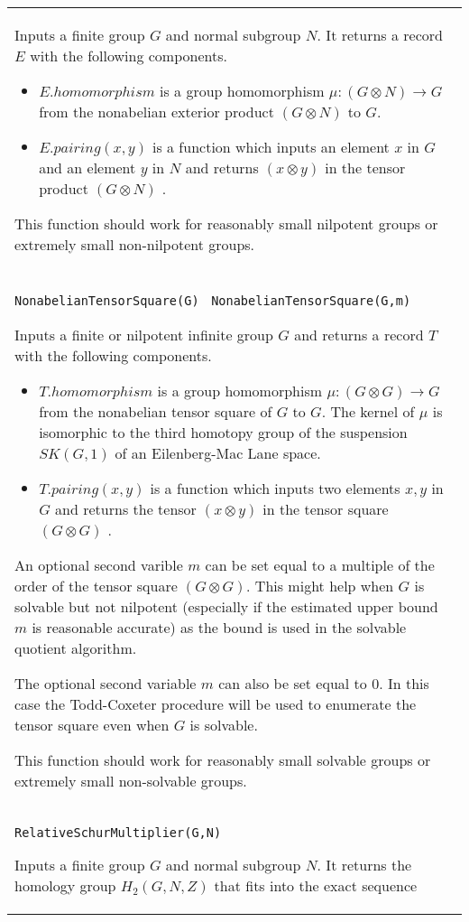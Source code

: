 \documentclass[a4paper,11pt]{report}
\begin{document}
{\begin{center}
\begin{tabular}{|l|}
 Inputs a finite group $G$ and normal subgroup $N$. It returns a record $E$ with the following components. 
\begin{itemize}
\item  $E.homomorphism$ is a group homomorphism ${\ensuremath{\mu}} : (G \otimes N ) \longrightarrow G$ from the nonabelian exterior product $(G \otimes N)$ to $G$. 
\item  $E.pairing(x,y)$ is a function which inputs an element $x$ in $G$ and an element $y$ in $N$ and returns $(x \otimes y)$ in the tensor product $(G \otimes N)$ . 
\end{itemize}
 This function should work for reasonably small nilpotent groups or extremely
small non-nilpotent groups. \\
 \index{NonabelianTensorSquare} \texttt{NonabelianTensorSquare(G) } \texttt{NonabelianTensorSquare(G,m) } 

 Inputs a finite or nilpotent infinite group $G$ and returns a record $T$ with the following components. 
\begin{itemize}
\item  $T.homomorphism$ is a group homomorphism ${\ensuremath{\mu}} : (G \otimes G) \longrightarrow G$ from the nonabelian tensor square of $G$ to $G$. The kernel of ${\ensuremath{\mu}}$ is isomorphic to the third homotopy group of the suspension $SK(G,1)$ of an Eilenberg-Mac Lane space. 
\item  $T.pairing(x,y)$ is a function which inputs two elements $x, y$ in $G$ and returns the tensor $(x \otimes y)$ in the tensor square $(G \otimes G)$ . 
\end{itemize}
 An optional second varible $m$ can be set equal to a multiple of the order of the tensor square $(G \otimes G)$. This might help when $G$ is solvable but not nilpotent (especially if the estimated upper bound $m$ is reasonable accurate) as the bound is used in the solvable quotient
algorithm. 

 The optional second variable $m$ can also be set equal to $0$. In this case the Todd-Coxeter procedure will be used to enumerate the tensor
square even when $G$ is solvable. 

 This function should work for reasonably small solvable groups or extremely
small non-solvable groups. \\
 \index{RelativeSchurMultiplier} \texttt{RelativeSchurMultiplier(G,N) } 

 Inputs a finite group $G$ and normal subgroup $N$. It returns the homology group $H_2(G,N,Z)$ that fits into the exact sequence 


\end{tabular}
\end{center}}
\end{document}
